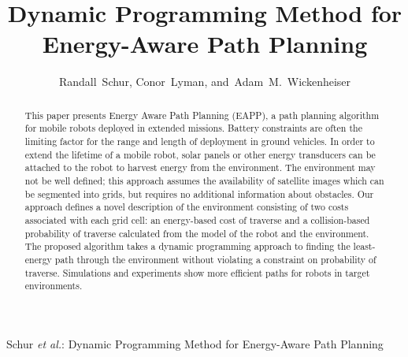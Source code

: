 \documentclass[journal]{IEEEtran}
\newcounter{col}
\begin{document}
\title{Dynamic Programming Method for Energy-Aware Path Planning}

%

\author{Randall~Schur, Conor~Lyman,
        and~Adam~M.~Wickenheiser
}


%
{Schur \MakeLowercase{\textit{et al.}}: Dynamic Programming Method for Energy-Aware Path Planning}

\maketitle

\begin{abstract}
This paper presents Energy Aware Path Planning (EAPP), a path planning algorithm for mobile robots deployed in extended missions. Battery constraints are often the limiting factor for the range and length of deployment in ground vehicles. In order to extend the lifetime of a mobile robot, solar panels or other energy transducers can be attached to the robot to harvest energy from the environment. The environment may not be well defined; this approach assumes the availability of satellite images which can be segmented into grids, but requires no additional information about obstacles. Our approach defines a novel description of the environment consisting of two costs associated with each grid cell: an energy-based cost of traverse and a collision-based probability of traverse calculated from the model of the robot and the environment. The proposed algorithm takes a dynamic programming approach to finding the least-energy path through the environment without violating a constraint on probability of traverse. Simulations and experiments show more efficient paths for robots in target environments.
\end{abstract}
\end{document}

